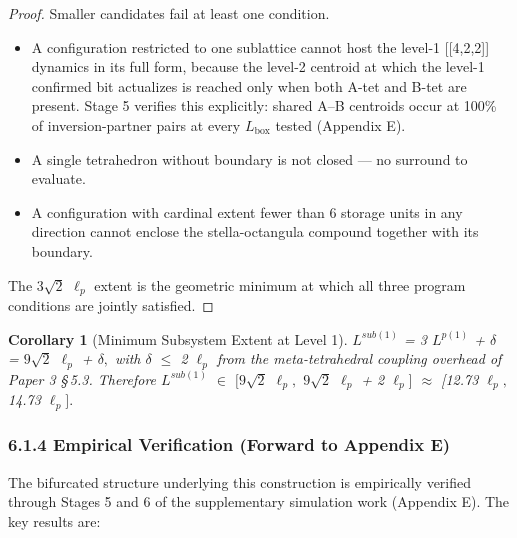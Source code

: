 \documentclass[11pt,oneside]{report}
\newtheorem{corollary}[theorem]{Corollary}
\theoremstyle{definition}
\theoremstyle{remark}
\begin{document}
\begin{proof}
Smaller candidates fail at least one condition.

\begin{itemize}
\item
  A configuration restricted to one sublattice cannot host the level-1
  [[4,2,2]] dynamics in its full form, because the level-2
  centroid at which the level-1 confirmed bit actualizes is reached only
  when both A-tet and B-tet are present. Stage 5 verifies this
  explicitly: shared A--B centroids occur at 100\% of inversion-partner
  pairs at every \ensuremath{L_{\mathrm{box}}} tested (Appendix E).
\end{itemize}

\begin{itemize}
\item
  A single tetrahedron without boundary is not closed --- no surround to
  evaluate.
\end{itemize}

\begin{itemize}
\item
  A configuration with cardinal extent fewer than 6 storage units in any
  direction cannot enclose the stella-octangula compound together with
  its boundary.
\end{itemize}

The \ensuremath{3\sqrt{2}} \ensuremath{\ell_{p}} extent is the geometric minimum at which all three program
conditions are jointly satisfied.

\end{proof}

\begin{corollary}[Minimum Subsystem Extent at Level 1]
\ensuremath{L^{sub(1)}} = 3 \ensuremath{L^{p(1)}} + \ensuremath{\delta} = \ensuremath{9\sqrt{2}} \ensuremath{\ell_{p}} + \ensuremath{\delta ,} with \ensuremath{\delta} \ensuremath{\leq} 2 \ensuremath{\ell_{p}} from the
meta-tetrahedral coupling overhead of Paper 3 \S\,5.3. Therefore \ensuremath{L^{sub(1)}}
\ensuremath{\in} \ensuremath{[9\sqrt{2}} \ensuremath{\ell_{p},} \ensuremath{9\sqrt{2}} \ensuremath{\ell_{p}} + 2 \ensuremath{\ell_{p}]} \ensuremath{\approx} [12.73 \ensuremath{\ell_{p},} 14.73 \ensuremath{\ell_{p}].}
\end{corollary}

\subsubsection*{6.1.4 Empirical Verification (Forward to Appendix E)}

The bifurcated structure underlying this construction is empirically
verified through Stages 5 and 6 of the supplementary simulation work
(Appendix E). The key results are:
\end{document}
